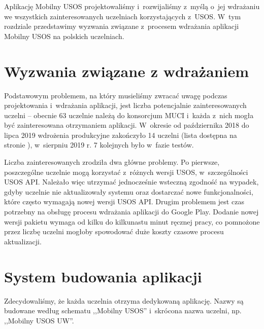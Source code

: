 \documentclass{pracamgr}
\begin{document}
Aplikację Mobilny USOS projektowaliśmy i~rozwijaliśmy z~myślą o~jej wdrażaniu we wszystkich zainteresowanych uczelniach
korzystających z~USOS. W~tym rozdziale przedstawimy wyzwania związane z~procesem wdrażania aplikacji Mobilny USOS na
polskich uczelniach.

\section{Wyzwania związane z wdrażaniem}

Podstawowym problemem, na który musieliśmy zwracać uwagę podczas projektowania i~wdrażania aplikacji, jest liczba
potencjalnie zainteresowanych uczelni -- obecnie 63 uczelnie należą do konsorcjum MUCI \cite{uczelnie-w-muci} i~każda
z~nich mogła być zainteresowana otrzymaniem aplikacji. W~okresie od października 2018 do lipca 2019 wdrożenia
produkcyjne zakończyło 14 uczelni (lista dostępna na stronie \cite{usos-wdrozenia}), w~sierpniu 2019 r. 7 kolejnych było w~fazie testów.

Liczba zainteresowanych zrodziła dwa główne problemy. Po pierwsze, poszczególne uczelnie mogą korzystać z~różnych
wersji USOS, w~szczególności USOS API. Należało więc utrzymać jednocześnie wsteczną zgodność na wypadek, gdyby uczelnie
nie aktualizowały systemu oraz dostarczać nowe funkcjonalności, które często wymagają nowej wersji USOS API. Drugim
problemem jest czas potrzebny na obsługę procesu wdrażania aplikacji do Google Play. Dodanie nowej wersji pakietu
wymaga od kilku do kilkunastu minut ręcznej pracy, co pomnożone przez liczbę uczelni mogłoby spowodować duże koszty
czasowe procesu aktualizacji.

\section{System budowania aplikacji}

Zdecydowaliśmy, że każda uczelnia otrzyma dedykowaną aplikację. Nazwy są budowane według schematu ,,Mobilny USOS'' i~skrócona nazwa uczelni, np. ,,Mobilny USOS UW''. 
\end{document}
